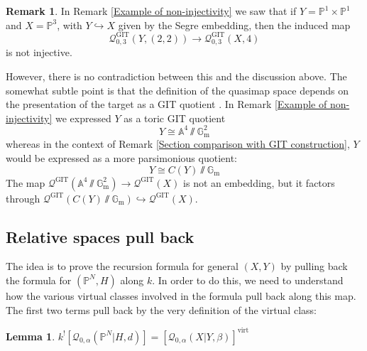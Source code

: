 \documentclass[11pt]{amsart}
\newcommand{\Q}[4]{\mathcal{Q}_{#1,#2}(#3,#4)}
\newcommand{\PP}{\mathbb P}
\renewcommand{\to}{\rightarrow}
\newcommand{\Aaff}{\mathbb{A}}
\newcommand{\Gm}{\mathbb{G}_{\text{m}}}
\newcommand{\virt}[1]{[#1]^{\operatorname{virt}}}
\theoremstyle{definition}
\newtheorem{lemma}[thm]{Lemma}
\theoremstyle{definition}
\newtheorem{remark}[thm]{Remark}
\begin{document}
\begin{remark} In Remark \ref{Example of non-injectivity} we saw that if $Y=\PP^1 \times \PP^1$ and $X=\PP^3$, with $Y \hookrightarrow X$ given by the Segre embedding, then the induced map
\begin{equation*} \mathcal{Q}^{\operatorname{GIT}}_{0,3}(Y,(2,2)) \to \mathcal{Q}^{\operatorname{GIT}}_{0,3}(X,4)\end{equation*}
is not injective.

However, there is no contradiction between this and the discussion above. The somewhat subtle point is that the definition of the quasimap space depends on the presentation of the target as a GIT quotient \cite[\S 4.6]{CFKM}. In Remark \ref{Example of non-injectivity} we expressed $Y$ as a toric GIT quotient
\begin{equation*} Y \cong \Aaff^4 \sslash \Gm^2 \end{equation*}
whereas in the context of Remark \ref{Section comparison with GIT construction}, $Y$ would be expressed as a more parsimonious quotient:
\begin{equation*} Y \cong C(Y) \sslash \Gm \end{equation*}
The map $\mathcal{Q}^{\operatorname{GIT}}(\Aaff^4\sslash\Gm^2) \to \mathcal{Q}^{\operatorname{GIT}}(X)$ is not an embedding, but it factors through $\mathcal{Q}^{\operatorname{GIT}}(C(Y)\sslash\Gm) \hookrightarrow \mathcal{Q}^{\operatorname{GIT}}(X)$.

\end{remark}


\subsection{Relative spaces pull back}
The idea is to prove the recursion formula for general $(X,Y)$ by pulling back the formula for $(\PP^N,H)$ along $k$. In order to do this, we need to understand how the various virtual classes involved in the formula pull back along this map. The first two terms pull back by the very definition of the virtual class:
\begin{lemma} \label{Relative spaces pull back} $k^! [\Q{0}{\alpha}{\PP^N|H}{d}] = \virt{\Q{0}{\alpha}{X|Y}{\beta}}$ \end{lemma}
\end{document}
